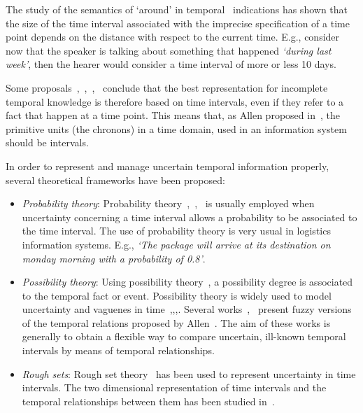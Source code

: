 The study of the semantics of `around' in temporal~\cite{Dev98} indications has shown that the size of the time interval associated with the imprecise specification of a time point depends on the distance with respect to the current time. E.g., consider now that the speaker is talking about something that happened \emph{`during last week'}, then the hearer would consider a time interval of more or less 10 days. 


Some proposals~\cite{knight1993},~\cite{Cru97},~\cite{nagypal2003},~\cite{Chountas2000} conclude that the best representation for incomplete temporal knowledge is therefore based on time intervals, even if they refer to a fact that happen at a time point. This means that, as Allen proposed in~\cite{Allen83}, the primitive units (the chronons) in a time domain, used in an information system should be intervals.

In order to represent and manage uncertain temporal information properly, several theoretical frameworks have been proposed:

\begin{itemize}
\item \emph{Probability theory}:
Probability theory~\cite{Dey1996},~\cite{Lakshmanan1997},~\cite{Haddawy1996} is usually employed when uncertainty concerning a time interval allows a probability to be associated to the time interval. The use of probability theory is very usual in logistics information systems. E.g., \emph{`The package will arrive at its destination on monday morning with a probability of 0.8'}.



\item \emph{Possibility theory}:
Using possibility theory~\cite{Dubois:Prade:1988:PossibilityTheory}, a possibility degree is associated to the temporal fact or event. Possibility theory is widely used to model uncertainty and vaguenes in time~\cite{Dubois:jucs_9_9:fuzziness_and_uncertainty_in},\cite{Dubois89},\cite{devos94},\cite{nagypal2003}. Several works~\cite{schockaert08},~\cite{ohlbach2004} present fuzzy versions of the temporal relations proposed by Allen~\cite{Allen83}. The aim of these works is generally to obtain a flexible way to compare uncertain, ill-known temporal intervals by means of temporal relationships.


\item \emph{Rough sets}:
Rough set theory~\cite{Pawlak1995} has been used to represent uncertainty in time intervals. The two dimensional representation of time intervals and the temporal relationships between them has been studied in~\cite{Qia09}.
\end{itemize}



